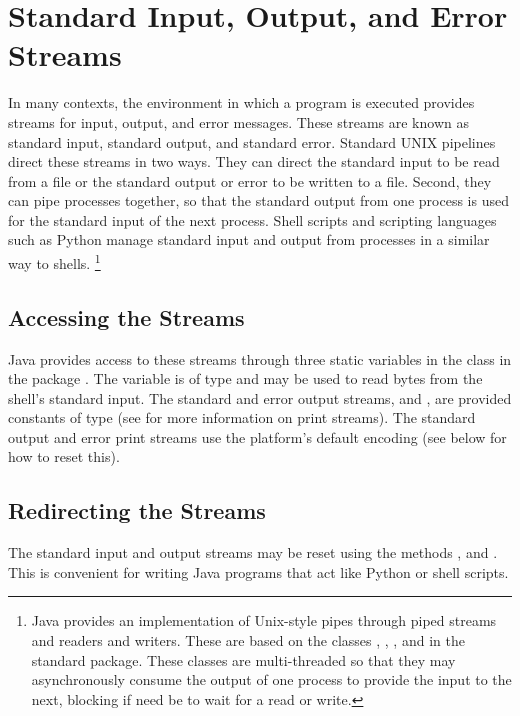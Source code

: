 \section{Standard Input, Output, and Error Streams}\label{section:io-stdin-stdout}

In many contexts, the environment in which a program is executed
provides streams for input, output, and error messages.  These streams
are known as standard input, standard output, and standard error.
Standard UNIX pipelines direct these streams in two ways.  They can
direct the standard input to be read from a file or the standard
output or error to be written to a file.  Second, they can pipe
processes together, so that the standard output from one process is
used for the standard input of the next process.
Shell scripts and scripting languages such as Python manage standard
input and output from processes in a similar way to shells.%
%
\footnote{Java provides an implementation of Unix-style pipes through
  piped streams and readers and writers.  These are based on the
  classes , ,
  , and  in the standard
   package.  These classes are multi-threaded so that
  they may asynchronously consume the output of one process to provide
  the input to the next, blocking if need be to wait for a read or write.}
%

\subsection{Accessing the Streams}

Java provides access to these streams through three static variables
in the class  in the package .  The
variable  is of type 
and may be used to read bytes from the shell's standard input.  The
standard and error output streams,  and
, are provided constants of type 
(see  for more information on print streams).
The standard output and error print streams use the platform's
default encoding (see below for how to reset this).

\subsection{Redirecting the Streams}

The standard input and output streams may be reset using the methods
,  and
.  This is convenient for writing Java
programs that act like Python or shell scripts.  

